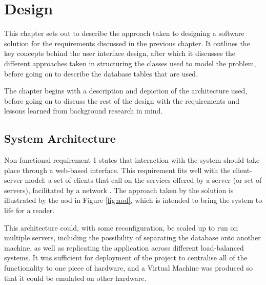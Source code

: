 \chapter{Design}
\label{design}

This chapter sets out to describe the approach taken to designing a software solution for the requirements discussed in the previous chapter.  It outlines the key concepts behind the user interface design, after which it discusses the different approaches taken in structuring the classes used to model the problem, before going on to describe the database tables that are used.

The chapter begins with a description and depiction of the architecture used, before going on to discuss the rest of the design with the requirements and lessons learned from background research in mind. 

\section{System Architecture}
Non-functional requirement 1 states that interaction with the system should take place through a web-based interface.  This requirement fits well with the client-server model: a set of clients that call on the services offered by a server (or set of servers), facilitated by a network \cite{sommerville}.  The approach taken by the solution is illustrated by the \gls{aod} in Figure \ref{fig:aod}, which is intended to bring the system to life for a reader.

This architecture could, with some reconfiguration, be scaled up to run on multiple servers, including the possibility of separating the database onto another machine, as well as replicating the application across different load-balanced systems.  It was sufficient for deployment of the project to centralise all of the functionality to one piece of hardware, and a Virtual Machine was produced so that it could be emulated on other hardware.

